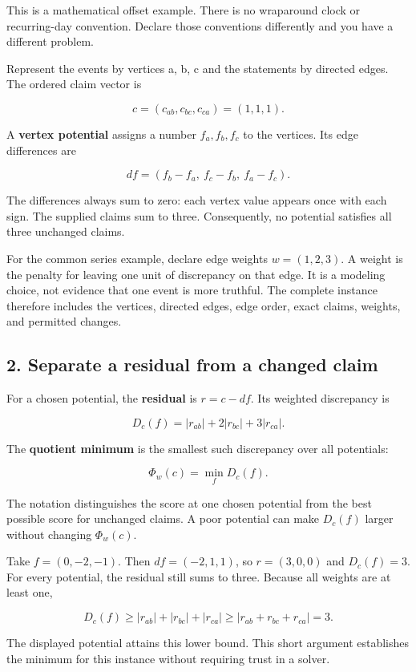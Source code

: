 \documentclass[
  11pt,
]{article}
\begin{document}
This is a mathematical offset example. There is no wraparound clock or
recurring-day convention. Declare those conventions differently and you
have a different problem.

Represent the events by vertices a, b, c and the statements by directed
edges. The ordered claim vector is

\[
c=(c_{ab},c_{bc},c_{ca})=(1,1,1).
\]

A \textbf{vertex potential} assigns a number \(f_a,f_b,f_c\) to the
vertices. Its edge differences are

\[
df=(f_b-f_a,\ f_c-f_b,\ f_a-f_c).
\]

The differences always sum to zero: each vertex value appears once with
each sign. The supplied claims sum to three. Consequently, no potential
satisfies all three unchanged claims.

For the common series example, declare edge weights \(w=(1,2,3)\). A
weight is the penalty for leaving one unit of discrepancy on that edge.
It is a modeling choice, not evidence that one event is more truthful.
The complete instance therefore includes the vertices, directed edges,
edge order, exact claims, weights, and permitted changes.

\subsection{2. Separate a residual from a changed
claim}\label{separate-a-residual-from-a-changed-claim}

For a chosen potential, the \textbf{residual} is \(r=c-df\). Its
weighted discrepancy is

\[
D_c(f)=|r_{ab}|+2|r_{bc}|+3|r_{ca}|.
\]

The \textbf{quotient minimum} is the smallest such discrepancy over all
potentials:

\[
\Phi_w(c)=\min_f D_c(f).
\]

The notation distinguishes the score at one chosen potential from the
best possible score for unchanged claims. A poor potential can make
\(D_c(f)\) larger without changing \(\Phi_w(c)\).

Take \(f=(0,-2,-1)\). Then \(df=(-2,1,1)\), so \(r=(3,0,0)\) and
\(D_c(f)=3\). For every potential, the residual still sums to three.
Because all weights are at least one,

\[
D_c(f)\geq |r_{ab}|+|r_{bc}|+|r_{ca}|
\geq |r_{ab}+r_{bc}+r_{ca}|=3.
\]

The displayed potential attains this lower bound. This short argument
establishes the minimum for this instance without requiring trust in a
solver.
\end{document}
